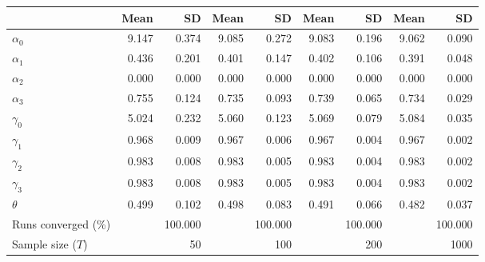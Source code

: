 
\begin{tabular}[t]{lrrrrrrrr}
\toprule
  & Mean & SD & Mean  & SD  & Mean   & SD   & Mean    & SD   \\
\midrule
$\alpha_{0}$ & 9.147 & 0.374 & 9.085 & 0.272 & 9.083 & 0.196 & 9.062 & 0.090\\
$\alpha_{1}$ & 0.436 & 0.201 & 0.401 & 0.147 & 0.402 & 0.106 & 0.391 & 0.048\\
$\alpha_{2}$ & 0.000 & 0.000 & 0.000 & 0.000 & 0.000 & 0.000 & 0.000 & 0.000\\
$\alpha_{3}$ & 0.755 & 0.124 & 0.735 & 0.093 & 0.739 & 0.065 & 0.734 & 0.029\\
$\gamma_{0}$ & 5.024 & 0.232 & 5.060 & 0.123 & 5.069 & 0.079 & 5.084 & 0.035\\
$\gamma_{1}$ & 0.968 & 0.009 & 0.967 & 0.006 & 0.967 & 0.004 & 0.967 & 0.002\\
$\gamma_{2}$ & 0.983 & 0.008 & 0.983 & 0.005 & 0.983 & 0.004 & 0.983 & 0.002\\
$\gamma_{3}$ & 0.983 & 0.008 & 0.983 & 0.005 & 0.983 & 0.004 & 0.983 & 0.002\\
$\theta$ & 0.499 & 0.102 & 0.498 & 0.083 & 0.491 & 0.066 & 0.482 & 0.037\\
Runs converged (\%) &  & 100.000 &  & 100.000 &  & 100.000 &  & 100.000\\
Sample size ($T$) &  & 50 &  & 100 &  & 200 &  & 1000\\
\bottomrule
\end{tabular}
